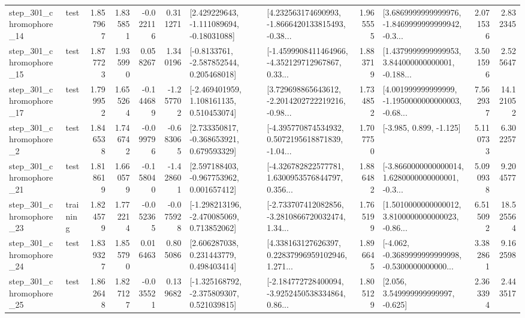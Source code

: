 \begin{tabular}{llrrrrllrlrr}
  step\_301\_chromophore\_14 &      test &      1.857967 &    1.835851 &     -0.022116 &  0.311271 &    [2.429229643, -1.111089694, -0.18031088] &  [4.232563174690993, -1.8666420133815493, -0.38... &       1.965555 &  [3.6869999999999976, -1.8469999999999942, -0.3... &            2.071536 &          2.832345 \\
  step\_301\_chromophore\_15 &      test &      1.877723 &    1.935990 &      0.058267 &  1.340196 &     [-0.8133761, -2.587852544, 0.205468018] &  [-1.4599908411464966, -4.352129712967867, 0.33... &       1.883719 &  [1.4379999999999953, 3.844000000000001, -0.188... &            3.501596 &          2.525647 \\
  step\_301\_chromophore\_17 &      test &      1.799952 &    1.655264 &     -0.144689 & -1.257702 &    [-2.469401959, 1.108161135, 0.510453074] &  [3.729698865643612, -2.2014202722219216, -0.98... &       1.734852 &  [4.001999999999999, -1.1950000000000003, -0.68... &            7.562937 &         14.121052 \\
   step\_301\_chromophore\_2 &      test &      1.846538 &    1.746742 &     -0.099796 & -0.683065 &    [2.733350817, -0.368653921, 0.679593329] &  [-4.395770874534932, 0.5072195618871839, -1.04... &       1.707750 &                            [-3.985, 0.899, -1.125] &            5.110733 &          6.302257 \\
  step\_301\_chromophore\_21 &      test &      1.818619 &    1.660579 &     -0.158040 & -1.428601 &    [2.597188403, -0.967753962, 0.001657412] &  [-4.326782822577781, 1.6300953576844797, 0.356... &       1.886482 &  [-3.8660000000000014, 1.6280000000000001, -0.3... &            5.090938 &          9.204577 \\
  step\_301\_chromophore\_23 &  training &      1.824579 &    1.772214 &     -0.052365 & -0.075928 &   [-1.298213196, -2.470085069, 0.713852062] &  [-2.733707412082856, -3.2810866720032474, 1.34... &       1.765199 &  [1.5010000000000012, 3.8100000000000023, -0.86... &            6.515092 &         18.525564 \\
  step\_301\_chromophore\_24 &      test &      1.839327 &    1.855790 &      0.016463 &  0.805086 &     [2.606287038, 0.231443779, 0.498403414] &  [4.338163127626397, 0.22837996959102946, 1.271... &       1.896645 &  [-4.062, -0.3689999999999998, -0.5300000000000... &            3.382861 &          9.162598 \\
  step\_301\_chromophore\_25 &      test &      1.862648 &    1.827127 &     -0.035521 &  0.139682 &   [-1.325168792, -2.375809307, 0.521039815] &  [-2.184772728400094, -3.9252450538334864, 0.86... &       1.805129 &                 [2.056, 3.549999999999997, -0.625] &            2.363394 &          2.443517 \\

\end{tabular}
